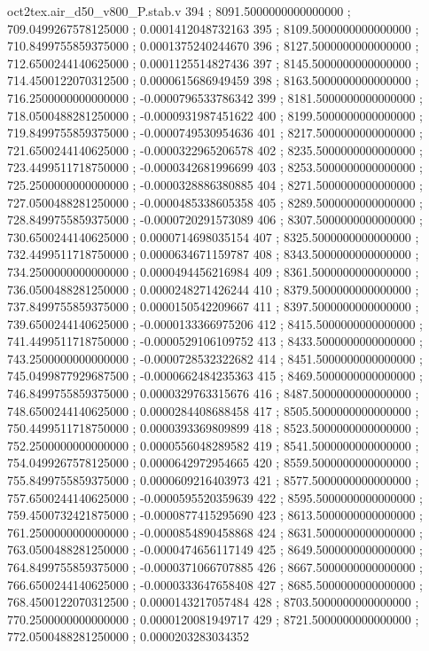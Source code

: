 \begin{filecontents}[overwrite]{oct2tex.air_d50_v800_P.stab.v}
394 ; 8091.5000000000000000 ; 709.0499267578125000 ; 0.0001412048732163
395 ; 8109.5000000000000000 ; 710.8499755859375000 ; 0.0001375240244670
396 ; 8127.5000000000000000 ; 712.6500244140625000 ; 0.0001125514827436
397 ; 8145.5000000000000000 ; 714.4500122070312500 ; 0.0000615686949459
398 ; 8163.5000000000000000 ; 716.2500000000000000 ; -0.0000796533786342
399 ; 8181.5000000000000000 ; 718.0500488281250000 ; -0.0000931987451622
400 ; 8199.5000000000000000 ; 719.8499755859375000 ; -0.0000749530954636
401 ; 8217.5000000000000000 ; 721.6500244140625000 ; -0.0000322965206578
402 ; 8235.5000000000000000 ; 723.4499511718750000 ; -0.0000342681996699
403 ; 8253.5000000000000000 ; 725.2500000000000000 ; -0.0000328886380885
404 ; 8271.5000000000000000 ; 727.0500488281250000 ; -0.0000485338605358
405 ; 8289.5000000000000000 ; 728.8499755859375000 ; -0.0000720291573089
406 ; 8307.5000000000000000 ; 730.6500244140625000 ; 0.0000714698035154
407 ; 8325.5000000000000000 ; 732.4499511718750000 ; 0.0000634671159787
408 ; 8343.5000000000000000 ; 734.2500000000000000 ; 0.0000494456216984
409 ; 8361.5000000000000000 ; 736.0500488281250000 ; 0.0000248271426244
410 ; 8379.5000000000000000 ; 737.8499755859375000 ; 0.0000150542209667
411 ; 8397.5000000000000000 ; 739.6500244140625000 ; -0.0000133366975206
412 ; 8415.5000000000000000 ; 741.4499511718750000 ; -0.0000529106109752
413 ; 8433.5000000000000000 ; 743.2500000000000000 ; -0.0000728532322682
414 ; 8451.5000000000000000 ; 745.0499877929687500 ; -0.0000662484235363
415 ; 8469.5000000000000000 ; 746.8499755859375000 ; 0.0000329763315676
416 ; 8487.5000000000000000 ; 748.6500244140625000 ; 0.0000284408688458
417 ; 8505.5000000000000000 ; 750.4499511718750000 ; 0.0000393369809899
418 ; 8523.5000000000000000 ; 752.2500000000000000 ; 0.0000556048289582
419 ; 8541.5000000000000000 ; 754.0499267578125000 ; 0.0000642972954665
420 ; 8559.5000000000000000 ; 755.8499755859375000 ; 0.0000609216403973
421 ; 8577.5000000000000000 ; 757.6500244140625000 ; -0.0000595520359639
422 ; 8595.5000000000000000 ; 759.4500732421875000 ; -0.0000877415295690
423 ; 8613.5000000000000000 ; 761.2500000000000000 ; -0.0000854890458868
424 ; 8631.5000000000000000 ; 763.0500488281250000 ; -0.0000474656117149
425 ; 8649.5000000000000000 ; 764.8499755859375000 ; -0.0000371066707885
426 ; 8667.5000000000000000 ; 766.6500244140625000 ; -0.0000333647658408
427 ; 8685.5000000000000000 ; 768.4500122070312500 ; 0.0000143217057484
428 ; 8703.5000000000000000 ; 770.2500000000000000 ; 0.0000120081949717
429 ; 8721.5000000000000000 ; 772.0500488281250000 ; 0.0000203283034352

\end{filecontents}
